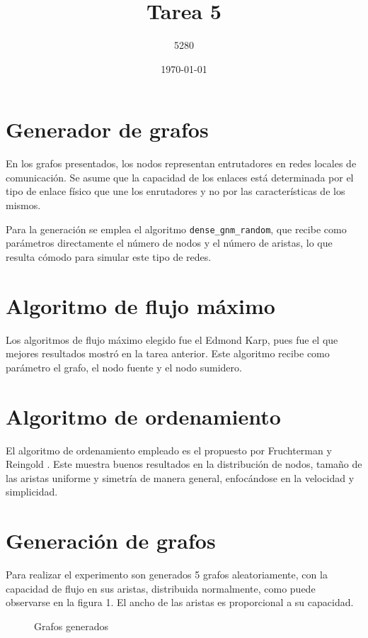 \documentclass{article}
\title{
Tarea 5
}
\author{5280}
\date{\today}
\begin{document}
\maketitle

\section*{Generador de grafos} 

En los grafos presentados, los nodos representan entrutadores en redes locales de comunicación. Se asume que la capacidad de los enlaces está determinada por el tipo de enlace físico que une los  enrutadores y no por las características de los mismos. 

Para la generación se emplea el algoritmo \texttt{dense\_gnm\_random}, que recibe como parámetros directamente el número de nodos y el número de aristas, lo que resulta cómodo para simular este tipo de redes.

\section*{Algoritmo de flujo máximo}

Los algoritmos de flujo máximo elegido fue el Edmond Karp, pues fue el que mejores resultados mostró en la tarea anterior. Este algoritmo recibe como parámetro el grafo, el nodo fuente y el nodo sumidero.

\section*{Algoritmo de ordenamiento}

El algoritmo de ordenamiento empleado es el propuesto por Fruchterman y Reingold \citep{fruchterman1991graph}. Este muestra buenos resultados en la distribución de nodos, tamaño de las aristas uniforme y simetría de manera general, enfocándose en la velocidad y simplicidad.

\section*{Generación de grafos}

Para realizar el experimento son generados 5 grafos aleatoriamente, con la capacidad de flujo en sus aristas, distribuida normalmente, como puede observarse en la figura 1. El ancho de las aristas es proporcional a su capacidad. 

\begin{figure}[htbp]
\centering
{}
\caption{Grafos generados}
\label{Grafos} 
\end{figure}
\end{document}
